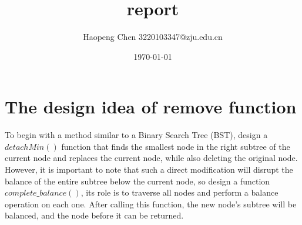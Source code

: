 \documentclass[a4paper]{article}
\begin{document}
\title{report}
\author{Haopeng Chen 3220103347@zju.edu.cn}
\date{\today}
\maketitle
\section*{The design idea of remove function}

To begin with a method similar to a Binary Search Tree (BST), design a $detachMin()$ function that finds the smallest node in the right subtree of the current node and replaces the current node, while also deleting the original node. However, it is important to note that such a direct modification will disrupt the balance of the entire subtree below the current node, so design a function $complete\_balance()$, its role is to traverse all nodes and perform a balance operation on each one. After calling this function, the new node's subtree will be balanced, and the node before it can be returned.
\end{document}
